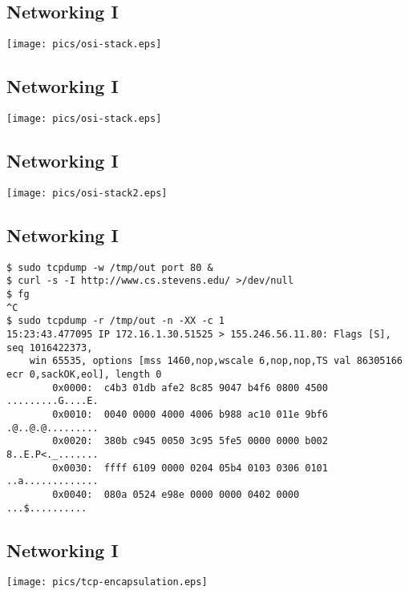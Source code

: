 \documentclass[xga]{xdvislides}
\begin{document}
\subsection{Networking I}
\vspace*{\fill}
\begin{center}
	\texttt{[image: pics/osi-stack.eps]}
\end{center}
\vspace*{\fill}

\subsection{Networking I}
\vspace*{\fill}
\begin{center}
	\texttt{[image: pics/osi-stack.eps]}
\end{center}
\vspace*{\fill}

\subsection{Networking I}
\vspace*{\fill}
\begin{center}
	\texttt{[image: pics/osi-stack2.eps]}
\end{center}
\vspace*{\fill}

\subsection{Networking I}
\begin{verbatim}
$ sudo tcpdump -w /tmp/out port 80 &
$ curl -s -I http://www.cs.stevens.edu/ >/dev/null
$ fg
^C
$ sudo tcpdump -r /tmp/out -n -XX -c 1
15:23:43.477095 IP 172.16.1.30.51525 > 155.246.56.11.80: Flags [S], seq 1016422373,
    win 65535, options [mss 1460,nop,wscale 6,nop,nop,TS val 86305166 ecr 0,sackOK,eol], length 0
        0x0000:  c4b3 01db afe2 8c85 9047 b4f6 0800 4500  .........G....E.
        0x0010:  0040 0000 4000 4006 b988 ac10 011e 9bf6  .@..@.@.........
        0x0020:  380b c945 0050 3c95 5fe5 0000 0000 b002  8..E.P<._.......
        0x0030:  ffff 6109 0000 0204 05b4 0103 0306 0101  ..a.............
        0x0040:  080a 0524 e98e 0000 0000 0402 0000       ...$..........
\end{verbatim}

\subsection{Networking I}
\vspace*{\fill}
\begin{center}
	\texttt{[image: pics/tcp-encapsulation.eps]}
\end{center}
\vspace*{\fill}
\end{document}
